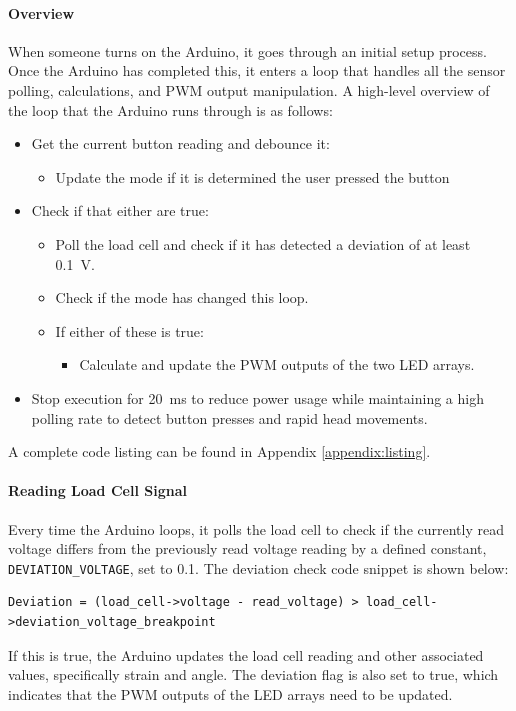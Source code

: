 \documentclass[twoside]{article}
\begin{document}
            \paragraph{Overview}
            When someone turns on the Arduino, it goes through an initial setup process. Once the Arduino has completed this, it enters a loop that handles all the sensor polling, calculations, and PWM output manipulation.
            A high-level overview of the loop that the Arduino runs through is as follows:
            \begin{itemize}
                \item Get the current button reading and debounce it: 
                \begin{itemize}
                    \item Update the mode if it is determined the user pressed the button
                \end{itemize}
                \item Check if that either are true:
                \begin{itemize}
                    \item Poll the load cell and check if it has detected a deviation of at least \SI{0.1}{\volt}. 
                    \item Check if the mode has changed this loop. 
                    \item If either of these is true:
                    \begin{itemize}
                        \item Calculate and update the PWM outputs of the two LED arrays.
                    \end{itemize}
                \end{itemize}
                \item Stop execution for \SI{20}{\milli\second} to reduce power usage while maintaining a high polling rate to detect button presses and rapid head movements.
            \end{itemize}
            A complete code listing can be found in Appendix \ref{appendix:listing}.
            \paragraph{Reading Load Cell Signal}
            Every time the Arduino loops, it polls the load cell to check if the currently read voltage differs from the previously read voltage reading by a defined constant, \texttt{DEVIATION\_VOLTAGE}, set to 0.1. The deviation check code snippet is shown below:
            \begin{lstlisting}
Deviation = (load_cell->voltage - read_voltage) > load_cell->deviation_voltage_breakpoint 
            \end{lstlisting}
            If this is true, the Arduino updates the load cell reading and other associated values, specifically strain and angle. The deviation flag is also set to true, which indicates that the PWM outputs of the LED arrays need to be updated.
\end{document}
